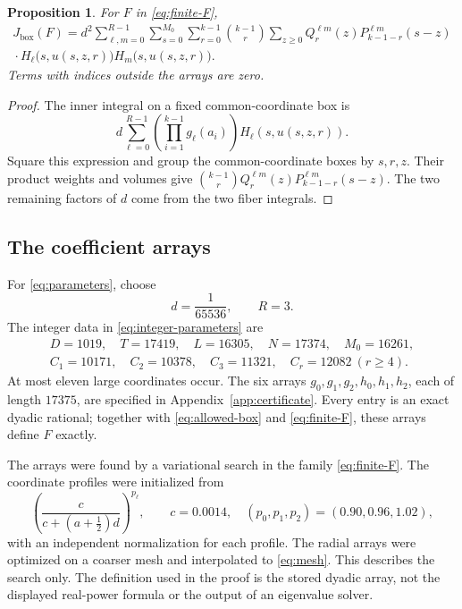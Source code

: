 \documentclass[11pt,reqno]{amsart}
\newtheorem{proposition}[theorem]{Proposition}
\theoremstyle{definition}
\theoremstyle{remark}
\numberwithin{equation}{section}
\newcommand{\Jb}{J_{\mathrm{box}}}
\begin{document}
\begin{proposition}\label{prop:finite-J}
For $F$ in \eqref{eq:finite-F},
\begin{multline}\label{eq:finite-J}
 \Jb(F)=d^2\sum_{\ell,m=0}^{R-1}\sum_{s=0}^{M_0}\sum_{r=0}^{k-1}
 \binom{k-1}{r}\sum_{z\ge0}
 Q^{\ell m}_r(z)P^{\ell m}_{k-1-r}(s-z)\\
 {}
 \cdot H_\ell\bigl(s,u(s,z,r)\bigr)
        H_m\bigl(s,u(s,z,r)\bigr).
\end{multline}
Terms with indices outside the arrays are zero.
\end{proposition}
\begin{proof}
The inner integral on a fixed common-coordinate box is
\[
 d\sum_{\ell=0}^{R-1}
   \left(\prod_{i=1}^{k-1}g_\ell(a_i)\right)
   H_\ell(s,u(s,z,r)).
\]
Square this expression and group the common-coordinate boxes by $s,r,z$.
Their product weights and volumes give
$\binom{k-1}{r}Q_r^{\ell m}(z)P_{k-1-r}^{\ell m}(s-z)$.
The two remaining factors of $d$ come from the two fiber integrals.
\end{proof}

\subsection{The coefficient arrays}
For \eqref{eq:parameters}, choose
\begin{equation}\label{eq:mesh}
 d=\frac1{65536},\qquad R=3.
\end{equation}
The integer data in \eqref{eq:integer-parameters} are
\begin{equation}\label{eq:integer-data}
\begin{gathered}
 D=1019,\quad T=17419,\quad L=16305,\quad N=17374,\quad M_0=16261,\\
 C_1=10171,\quad C_2=10378,\quad C_3=11321,\quad C_r=12082\ (r\ge4).
\end{gathered}
\end{equation}
At most eleven large coordinates occur. The six arrays
$g_0,g_1,g_2,h_0,h_1,h_2$, each of length $17375$, are specified in
Appendix~\ref{app:certificate}. Every entry is an exact dyadic rational;
together with \eqref{eq:allowed-box} and \eqref{eq:finite-F}, these arrays
define $F$ exactly.

The arrays were found by a variational search in the family
\eqref{eq:finite-F}. The coordinate profiles were initialized from
\[
 \left(\frac{c}{c+(a+\tfrac12)d}\right)^{p_\ell},\qquad
 c=0.0014,\quad(p_0,p_1,p_2)=(0.90,0.96,1.02),
\]
with an independent normalization for each profile. The radial arrays
were optimized on a coarser mesh and interpolated to \eqref{eq:mesh}.
This describes the search only. The definition used in the proof is the
stored dyadic array, not the displayed real-power formula or the output
of an eigenvalue solver.
\end{document}
